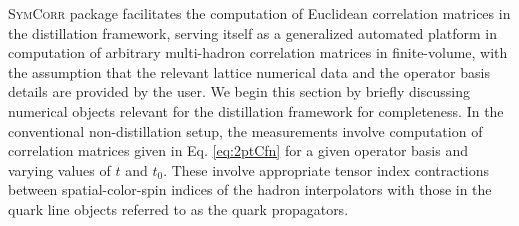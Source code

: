 \documentclass[a4paper,fleqn]{cas-dc}
\begin{document}
\textsc{SymCorr} package facilitates the computation of Euclidean correlation matrices in the distillation framework, serving itself as a generalized automated platform in computation of arbitrary multi-hadron correlation matrices in finite-volume, with the assumption that the relevant lattice numerical data and the operator basis details are provided by the user. We begin this section by briefly discussing numerical objects relevant for the distillation framework for completeness. In the conventional non-distillation setup, the measurements involve computation of correlation matrices given in Eq. \ref{eq:2ptCfn} for a given operator basis and varying values of $t$ and $t_0$. These involve appropriate tensor index contractions between spatial-color-spin indices of the hadron interpolators with those in the quark line objects referred to as the quark propagators.
\end{document}
